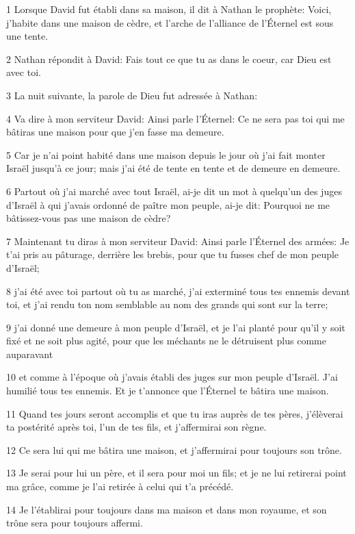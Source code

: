 \par 1 Lorsque David fut établi dans sa maison, il dit à Nathan le prophète: Voici, j'habite dans une maison de cèdre, et l'arche de l'alliance de l'Éternel est sous une tente.
\par 2 Nathan répondit à David: Fais tout ce que tu as dans le coeur, car Dieu est avec toi.
\par 3 La nuit suivante, la parole de Dieu fut adressée à Nathan:
\par 4 Va dire à mon serviteur David: Ainsi parle l'Éternel: Ce ne sera pas toi qui me bâtiras une maison pour que j'en fasse ma demeure.
\par 5 Car je n'ai point habité dans une maison depuis le jour où j'ai fait monter Israël jusqu'à ce jour; mais j'ai été de tente en tente et de demeure en demeure.
\par 6 Partout où j'ai marché avec tout Israël, ai-je dit un mot à quelqu'un des juges d'Israël à qui j'avais ordonné de paître mon peuple, ai-je dit: Pourquoi ne me bâtissez-vous pas une maison de cèdre?
\par 7 Maintenant tu diras à mon serviteur David: Ainsi parle l'Éternel des armées: Je t'ai pris au pâturage, derrière les brebis, pour que tu fusses chef de mon peuple d'Israël;
\par 8 j'ai été avec toi partout où tu as marché, j'ai exterminé tous tes ennemis devant toi, et j'ai rendu ton nom semblable au nom des grands qui sont sur la terre;
\par 9 j'ai donné une demeure à mon peuple d'Israël, et je l'ai planté pour qu'il y soit fixé et ne soit plus agité, pour que les méchants ne le détruisent plus comme auparavant
\par 10 et comme à l'époque où j'avais établi des juges sur mon peuple d'Israël. J'ai humilié tous tes ennemis. Et je t'annonce que l'Éternel te bâtira une maison.
\par 11 Quand tes jours seront accomplis et que tu iras auprès de tes pères, j'élèverai ta postérité après toi, l'un de tes fils, et j'affermirai son règne.
\par 12 Ce sera lui qui me bâtira une maison, et j'affermirai pour toujours son trône.
\par 13 Je serai pour lui un père, et il sera pour moi un fils; et je ne lui retirerai point ma grâce, comme je l'ai retirée à celui qui t'a précédé.
\par 14 Je l'établirai pour toujours dans ma maison et dans mon royaume, et son trône sera pour toujours affermi.
